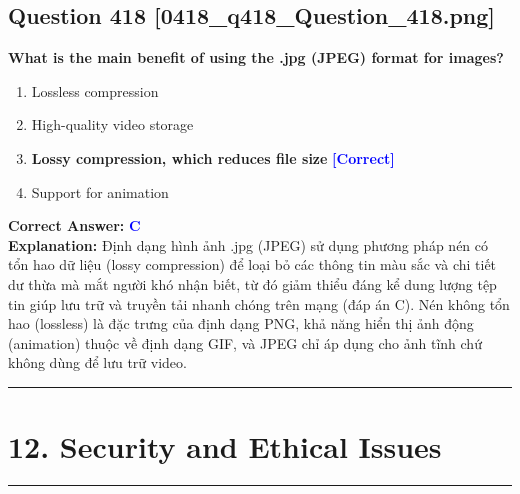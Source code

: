 \documentclass[11pt,a4paper]{article}
\begin{document}
\begin{minipage}{\textwidth}
\subsection*{Question 418 \quad \footnotesize{[0418\_q418\_Question\_418.png]}}
\noindent \textbf{What is the main benefit of using the .jpg (JPEG) format for images?}

\begin{enumerate}[label=\Alph*.]
    \item Lossless compression
    \item High-quality video storage
    \item \textbf{Lossy compression, which reduces file size} \hfill \textcolor{blue}{\textbf{[Correct]}}
    \item Support for animation
\end{enumerate}

\noindent \textbf{Correct Answer:} \textcolor{blue}{\textbf{C}} \\[2pt]
\noindent \textbf{Explanation:} Định dạng hình ảnh .jpg (JPEG) sử dụng phương pháp nén có tổn hao dữ liệu (lossy compression) để loại bỏ các thông tin màu sắc và chi tiết dư thừa mà mắt người khó nhận biết, từ đó giảm thiểu đáng kể dung lượng tệp tin giúp lưu trữ và truyền tải nhanh chóng trên mạng (đáp án C). Nén không tổn hao (lossless) là đặc trưng của định dạng PNG, khả năng hiển thị ảnh động (animation) thuộc về định dạng GIF, và JPEG chỉ áp dụng cho ảnh tĩnh chứ không dùng để lưu trữ video.

\par\vspace{0.3cm}
\hrule
\vspace{0.3cm}
\end{minipage}


\newpage
\section*{12. Security and Ethical Issues}
\hrule\vspace{0.5cm}
\end{document}
